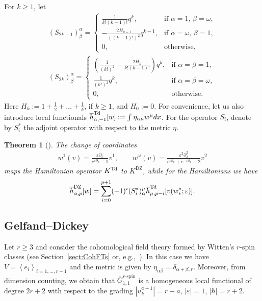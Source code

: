 \documentclass[pdftex]{sigma}
\numberwithin{equation}{section}
\newtheorem{Theorem}{Theorem}[section]
\newcommand{\oh}{\overline h}
\def\d{{\partial}}
\newcommand{\<}{\left<}
\renewcommand{\>}{\right>}
\newcommand{\eps}{\varepsilon}
\newcommand{\DZ}{\mathrm{DZ}}
\newcommand{\oG}{{\overline G}}
\begin{document}
For $k\ge 1$, let
\begin{gather*}%
(S_{2k-1})^\alpha_\beta=
\begin{cases}
\displaystyle \frac{1}{k!(k-1)!}q^k,&\text{if $\alpha=1$, $\beta=\omega$},\\
\displaystyle -\frac{2H_{k-1}}{((k-1)!)^2}q^{k-1},&\text{if $\alpha=\omega$, $\beta=1$},\\
0,&\text{otherwise},
\end{cases}
\\
(S_{2k})^\alpha_\beta=
\begin{cases}
\displaystyle \left(\frac{1}{(k!)^2}-\frac{2H_k}{k!(k-1)!}\right)q^k,&\text{if $\alpha=\beta=1$},\\
\displaystyle \frac{1}{(k!)^2}q^k,&\text{if $\alpha=\beta=\omega$},\\
0,&\text{otherwise}.
\end{cases}
\end{gather*}
Here $H_k:=1+\frac{1}{2}+\dots+\frac{1}{k}$, if $k\ge 1$, and $H_0:=0$. For convenience, let us also introduce local functionals $\oh^{\rm Td}_{\alpha,-1}[w]:=\int\eta_{\alpha\mu}w^\mu dx$. For the operator $S_i$, denote by $S^*_i$ the adjoint operator with respect to the metric $\eta$.

\begin{Theorem}[\cite{DZ05}]
The change of coordinates
\begin{gather*}%
w^1(v)=\frac{\eps\d_x}{e^{\eps\d_x}-1}v^1,\qquad w^\omega(v)=\frac{\eps^2\d_x^2}{e^{\eps\d_x}+e^{-\eps\d_x}-2}v^2
\end{gather*}
maps the Hamiltonian operator $K^{\rm Td}$ to $K^\DZ$, while for the Hamiltonians we have \begin{gather*}\oh^\DZ_{\alpha,p}[w]=\sum_{i=0}^{p+1}(-1)^i(S^*_i)^\mu_\alpha\oh^{\rm Td}_{\mu,p-i}[v(w^*_*;\eps)].\end{gather*}
\end{Theorem}

\subsection{Gelfand--Dickey}
Let $r\ge 3$ and consider the cohomological f\/ield theory formed by Witten's $r$-spin classes (see Section~\ref{sect:CohFTs} or, e.g.,~\cite{BG15}). In this case we have $V=\<e_i\>_{i=1,\dots,r-1}$ and the metric is given by $\eta_{\alpha\beta}=\delta_{\alpha+\beta,r}$. Moreover, from dimension counting, we obtain that $\oG^{r\text{-spin}}_{1,1}$ is a homogeneous local functional of degree $2r+2$ with respect to the grading
$|u^{a+1}_k|=r-a$, $|\eps|=1$, $|\hbar|=r+2$.
\end{document}
